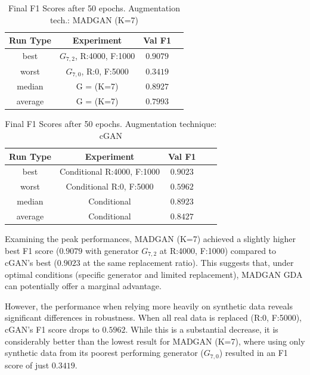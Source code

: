 \begin{table}[H]
	\vspace{-1.5em}
	\centering
	\begin{tabular}{|c|c|c|c|}
		\hline
		Run Type & Experiment & Val F1 \\ \hline
		best & \(G_{7, 2}\), R:4000, F:1000 & $0.9079$\\ \hline
		worst & \(G_{7, 0}\), R:0, F:5000 & $0.3419$\\ \hline
		median & G = (K=7) & $0.8927$\\ \hline
		average & G = (K=7) & $0.7993$
		\\ \hline
	\end{tabular}
    \caption{Final F1 Scores after 50 epochs. Augmentation tech.: MADGAN (K=7)}
        \label{tab:res_replacement_fashion_cgan_vs_madgan__madgan}
\end{table}
\begin{table}[H]
	\centering
	\vspace{-1.5em}
	\begin{tabular}{|c|c|c|c|c|}
		\hline
		Run Type & Experiment & Val F1 \\ \hline
		best & Conditional R:4000, F:1000 & $0.9023$\\ \hline
		worst & Conditional R:0, F:5000 & $0.5962$\\ \hline
		median & Conditional & $0.8923$\\ \hline
		average & Conditional & $0.8427$
		\\ \hline
	\end{tabular}
    \caption{Final F1 Scores after 50 epochs. Augmentation technique: cGAN}
        \label{tab:res_replacement_fashion_cgan_vs_madgan__cgan}
\end{table}
Examining the peak performances, MADGAN (K=7) achieved a slightly higher best F1 score ($0.9079$ with generator \(G_{7,2}\) at R:4000, F:1000) compared to cGAN's best ($0.9023$ at the same replacement ratio). This suggests that, under optimal conditions (specific generator and limited replacement), MADGAN GDA can potentially offer a marginal advantage.

However, the performance when relying more heavily on synthetic data reveals significant differences in robustness. When all real data is replaced (R:0, F:5000), cGAN's F1 score drops to $0.5962$. While this is a substantial decrease, it is considerably better than the lowest result for MADGAN (K=7), where using only synthetic data from its poorest performing generator (\(G_{7,0}\)) resulted in an F1 score of just $0.3419$.

